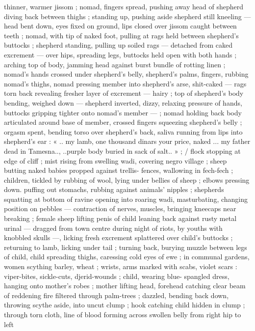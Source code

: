thinner, warmer jissom ; nomad, fingers spread, pushing away head
of shepherd diving back between thighs ; standing up, pushing aside
shepherd still kneeling --- head bent down, eyes fixed on ground,
lips closed over jissom caught between teeth ; nomad, with tip of
naked foot, pulling at rags held between shepherd's buttocks ;
shepherd standing, pulling up soiled rags --- detached from caked
excrement --- over hips, spreading legs, buttocks held open with
both hands ; arching top of body, jamming head against burst bundle
of rotting linen ; nomad's hands crossed under shepherd's belly,
shepherd's palms, fingers, rubbing nomad’s thighs, nomad pressing
member into shepherd's arse, shit-caked --- rags torn back revealing
fresher layer of excrement --- hairy ; top of shepherd's body
bending, weighed down --- shepherd inverted, dizzy, relaxing
pressure of hands, buttocks gripping tighter onto nomad’s member
--- ; nomad holding back body articulated around base of member,
crossed fingers squeezing shepherd's belly ; orgasm spent, bending
torso over shepherd's back, saliva running from lips into shepherd's
ear : « .. my lamb, one thousand dinars your price, naked ... my father
dead in Tamesna.., ..purple body buried in sack of salt.. » ; / flock
stopping at edge of cliff ; mist rising from swelling wadi, covering
negro village ; sheep butting naked babies propped against trellis-
fences, wallowing in fech-fech ; children, tickled by rubbing of wool,
lying under bellies of sheep ; elbows pressing down. puffing out
stomachs, rubbing against animals’ nipples ; shepherds squatting at
bottom of ravine opening into roaring wadi, masturbating, changing
position on pebbles --- contraction of nerves, muscles, bringing %
kneecaps near breaking ; female sheep lifting penis of child leaning
back against rusty metal urinal --- dragged from town centre during
night of riots, by youths with knobbled skulls ---, licking fresh
excrement splattered over child's buttocks ; returning to lamb, licking
under tail ; turning back, burying muzzle between legs of child, child
spreading thighs, caressing cold eyes of ewe ; in communal gardens,
women scything barley, wheat ; wrists, arms marked with scabs, violet
scars : viper-bites, sickle-cuts, djerid-wounds ; child, wearing blue-
spangled dress, hanging onto mother's robes ; mother lifting head,
forehead catching clear beam of reddening fire filtered through
palm-trees ; dazzled, bending back down, throwing scythe aside, into
uncut clump ; hook catching child hidden in clump ; through torn
cloth, line of blood forming across swollen belly from right hip to left
